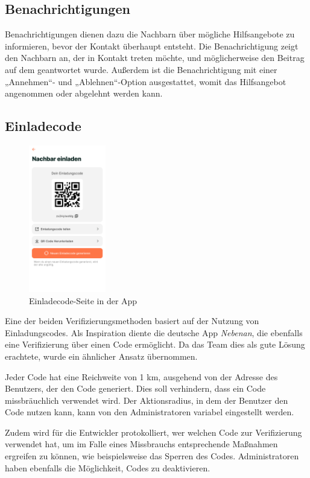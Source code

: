 \subsection{Benachrichtigungen}
Benachrichtigungen dienen dazu die Nachbarn über mögliche Hilfsangebote zu informieren, bevor der Kontakt überhaupt entsteht. Die Benachrichtigung zeigt den Nachbarn an, der in Kontakt treten möchte, und möglicherweise den Beitrag auf dem geantwortet wurde. Außerdem ist die Benachrichtigung mit einer „Annehmen“- und „Ablehnen“-Option ausgestattet, womit das Hilfsangebot angenommen oder abgelehnt werden kann.

\subsection{Einladecode}

\begin{figure}[H]
  \centering
  \includegraphics[width=0.3\textwidth]{pics/einladecode-page.png}
  \caption{Einladecode-Seite in der App}
  \label{fig:einladecode}
\end{figure}
Eine der beiden Verifizierungsmethoden basiert auf der Nutzung von Einladungscodes. Als Inspiration diente die deutsche App \textit{Nebenan}, die ebenfalls eine Verifizierung über einen Code ermöglicht. Da das Team dies als gute Lösung erachtete, wurde ein ähnlicher Ansatz übernommen.

Jeder Code hat eine Reichweite von 1 km, ausgehend von der Adresse des Benutzers, der den Code generiert. Dies soll verhindern, dass ein Code missbräuchlich verwendet wird. Der Aktionsradius, in dem der Benutzer den Code nutzen kann, kann von den Administratoren variabel eingestellt werden.

Zudem wird für die Entwickler protokolliert, wer welchen
Code zur Verifizierung verwendet hat, um im Falle eines
Missbrauchs entsprechende Maßnahmen ergreifen zu können, wie
beispielsweise das Sperren des Codes. Administratoren haben
ebenfalls die Möglichkeit, Codes zu deaktivieren.
